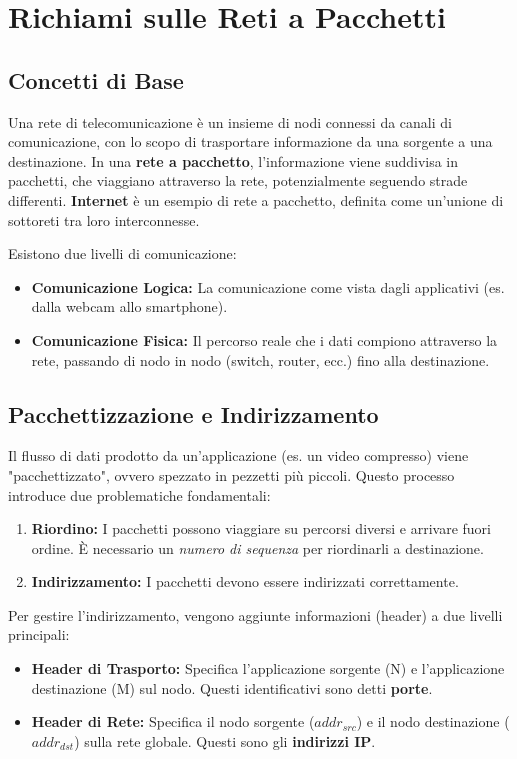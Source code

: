 \documentclass[../main.tex]{subfiles}
\begin{document}
\section{Richiami sulle Reti a Pacchetti}
\label{sec:reti}

\subsection{Concetti di Base}
Una rete di telecomunicazione è un insieme di nodi connessi da canali di comunicazione, con lo scopo di trasportare informazione da una sorgente a una destinazione.
In una \textbf{rete a pacchetto}, l'informazione viene suddivisa in pacchetti, che viaggiano attraverso la rete, potenzialmente seguendo strade differenti. \textbf{Internet} è un esempio di rete a pacchetto, definita come un'unione di sottoreti tra loro interconnesse.

Esistono due livelli di comunicazione:
\begin{itemize}
    \item \textbf{Comunicazione Logica:} La comunicazione come vista dagli applicativi (es. dalla webcam allo smartphone).
    \item \textbf{Comunicazione Fisica:} Il percorso reale che i dati compiono attraverso la rete, passando di nodo in nodo (switch, router, ecc.) fino alla destinazione.
\end{itemize}

\subsection{Pacchettizzazione e Indirizzamento}
Il flusso di dati prodotto da un'applicazione (es. un video compresso) viene "pacchettizzato", ovvero spezzato in pezzetti più piccoli. Questo processo introduce due problematiche fondamentali:
\begin{enumerate}
    \item \textbf{Riordino:} I pacchetti possono viaggiare su percorsi diversi e arrivare fuori ordine. È necessario un \emph{numero di sequenza} per riordinarli a destinazione.
    \item \textbf{Indirizzamento:} I pacchetti devono essere indirizzati correttamente.
\end{enumerate}

Per gestire l'indirizzamento, vengono aggiunte informazioni (header) a due livelli principali:
\begin{itemize}
    \item \textbf{Header di Trasporto:} Specifica l'applicazione sorgente (N) e l'applicazione destinazione (M) sul nodo. Questi identificativi sono detti \textbf{porte}.
    \item \textbf{Header di Rete:} Specifica il nodo sorgente ($addr_{src}$) e il nodo destinazione ($addr_{dst}$) sulla rete globale. Questi sono gli \textbf{indirizzi IP}.
\end{itemize}
\end{document}
